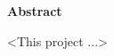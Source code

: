 %
\noindent \begin{center}
\textbf{\Large{}Abstract}
\par\end{center}{\Large \par}

\noindent \thispagestyle{empty}

<This project ...>%

